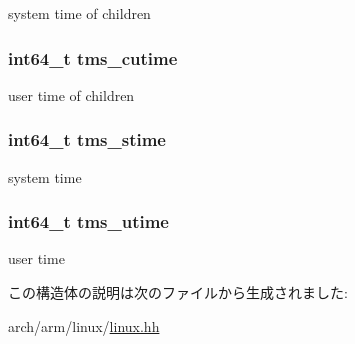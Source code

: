 system time of children \hypertarget{structArmLinux64_1_1tms_a6da7d6e7d686aa5a9bf91b8bf6c4139f}{
\subsubsection[{tms\_\-cutime}]{\setlength{\rightskip}{0pt plus 5cm}int64\_\-t {\bf tms\_\-cutime}}}
\label{structArmLinux64_1_1tms_a6da7d6e7d686aa5a9bf91b8bf6c4139f}


user time of children \hypertarget{structArmLinux64_1_1tms_a35539e36d7debbc4664f2470764bbad0}{
\subsubsection[{tms\_\-stime}]{\setlength{\rightskip}{0pt plus 5cm}int64\_\-t {\bf tms\_\-stime}}}
\label{structArmLinux64_1_1tms_a35539e36d7debbc4664f2470764bbad0}


system time \hypertarget{structArmLinux64_1_1tms_ab04ac3ffd1b9aab37d4a7857e0ffcdb8}{
\subsubsection[{tms\_\-utime}]{\setlength{\rightskip}{0pt plus 5cm}int64\_\-t {\bf tms\_\-utime}}}
\label{structArmLinux64_1_1tms_ab04ac3ffd1b9aab37d4a7857e0ffcdb8}


user time 

この構造体の説明は次のファイルから生成されました:\begin{DoxyCompactItemize}
\item 
arch/arm/linux/\hyperlink{arch_2arm_2linux_2linux_8hh}{linux.hh}\end{DoxyCompactItemize}
